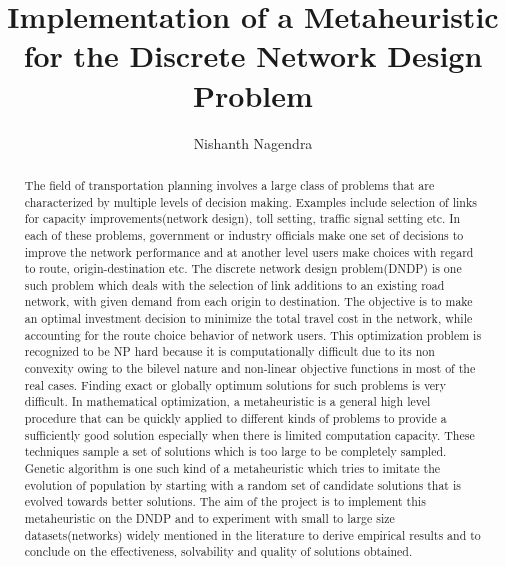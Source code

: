 \documentclass{article}
\begin{document}
\title{Implementation of a Metaheuristic for the Discrete Network Design Problem}
\author{Nishanth Nagendra}

\maketitle

\begin{abstract}
The field of transportation planning involves a large class of problems that are characterized by multiple levels of decision making. Examples include selection of links for capacity improvements(network design), toll setting, traffic signal setting etc. In each of these problems, government or industry officials make one set of decisions to improve the network performance and at another level users make choices with regard to route, origin-destination etc. The discrete network design problem(DNDP) is one such problem which deals with the selection of link additions to an existing road network, with given demand from each origin to destination. The objective is to make an optimal investment decision to minimize the total travel cost in the network, while accounting for the route choice behavior of network users. This optimization problem is recognized to be NP hard because it is computationally difficult due to its non convexity owing to the bilevel nature and non-linear objective functions in most of the real cases. Finding exact or globally optimum solutions for such problems is very difficult. In mathematical optimization, a metaheuristic is a general high level procedure that can be quickly applied to different kinds of problems to provide a sufficiently good solution especially when there is limited computation capacity. These techniques sample a set of solutions which is too large to be completely sampled. Genetic algorithm is one such kind of a metaheuristic which tries to imitate the evolution of population by starting with a random set of candidate solutions that is evolved towards better solutions. The aim of the project is to implement this metaheuristic on the DNDP and to experiment with small to large size datasets(networks) widely mentioned in the literature to derive empirical results and to conclude on the effectiveness, solvability and quality of solutions obtained.
\end{abstract}
\end{document}
